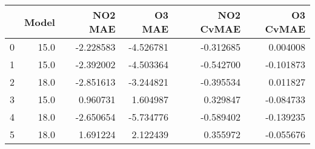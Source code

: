\begin{tabular}{lrrrrr}
\toprule
{} &  Model &   NO2 MAE &    O3 MAE &  NO2 CvMAE &  O3 CvMAE \\
\midrule
0 &   15.0 & -2.228583 & -4.526781 &  -0.312685 &  0.004008 \\
1 &   15.0 & -2.392002 & -4.503364 &  -0.542700 & -0.101873 \\
2 &   18.0 & -2.851613 & -3.244821 &  -0.395534 &  0.011827 \\
3 &   15.0 &  0.960731 &  1.604987 &   0.329847 & -0.084733 \\
4 &   18.0 & -2.650654 & -5.734776 &  -0.589402 & -0.139235 \\
5 &   18.0 &  1.691224 &  2.122439 &   0.355972 & -0.055676 \\
\bottomrule
\end{tabular}
